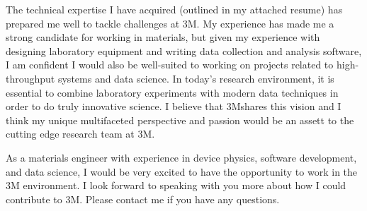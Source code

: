 \documentclass[11pt,a4paper,roman]{moderncv}        %
\newcommand{\company}{3M}
\begin{document}
The technical expertise I have acquired (outlined in my attached resume) has prepared me well to tackle challenges at \company.
My experience has made me a strong candidate for working in materials, but given my experience with designing laboratory equipment and writing data collection and analysis software, I am confident I would also be well-suited to working on projects related to high-throughput systems and data science.
In today's research environment, it is essential to combine laboratory experiments with modern data techniques in order to do truly innovative science.
I believe that \company shares this vision and I think my unique multifaceted perspective and passion would be an assett to the cutting edge research team at \company.

As a materials engineer with experience in device physics, software development, and data science, I would be very excited to have the opportunity to work in the 3M environment.
I look forward to speaking with you more about how I could contribute to 3M.
Please contact me if you have any questions.



\makeletterclosing
\end{document}
